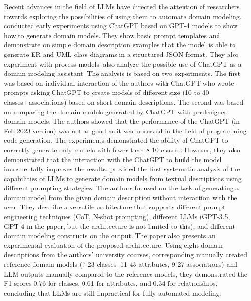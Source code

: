 Recent advances in the field of LLMs have directed the attention of researchers towards exploring the possibilities of using them to automate domain modeling. \citet{Fill2023} conducted early experiments using ChatGPT based on GPT-4 models \cite{Achiam2023} to show how to generate domain models. They show basic prompt templates and demonstrate on simple domain description examples that the model is able to generate ER and UML class diagrams in a structured JSON format.
They also experiment with process models.
\citet{Camara2023} also analyze the possible use of ChatGPT as a domain modeling assistant. The analysis is based on two experiments.
The first was based on individual interaction of the authors with ChatGPT who wrote prompts asking ChatGPT to create models of different size (10 to 40 classes+associations) based on short domain descriptions.
The second was based on comparing the domain models generated by ChatGPT with predesigned domain models. The authors showed that the performance of the ChatGPT (in Feb 2023 version) was not as good as it was observed in the field of programming code generation. The experiments demonstrated the ability of ChatGPT to correctly generate only models with fewer than 8-10 classes. However, they also demonstrated that the interaction with the ChatGPT to build the model incrementally improves the results.
\citet{Chen2023} provided the first systematic analysis of the capabilities of LLMs to generate domain models from textual descriptions using different prompting strategies. The authors focused on the task of generating a domain model from the given domain description without interaction with the user. They describe a versatile architecture that supports different prompt engineering techniques (CoT, N-shot prompting), different LLMs (GPT-3.5, GPT-4 in the paper, but the architecture is not limited to this), and different domain modeling constructs on the output.
The paper also presents an experimental evaluation of the proposed architecture. Using eight domain descriptions from the authors' university courses, corresponding manually created reference domain models (7-23 classes, 11-43 attributes, 9-27 associations) and LLM outputs manually compared to the reference models, they demonstrated the F1 scores 0.76 for classes, 0.61 for attributes, and 0.34 for relationships, concluding that LLMs are still impractical for fully automated modeling.

